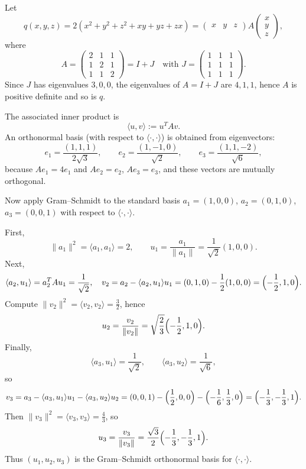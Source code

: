 \begin{solution}
Let
\[
q(x,y,z)=2(x^2+y^2+z^2+xy+yz+zx)=\begin{pmatrix}x&y&z\end{pmatrix}A\begin{pmatrix}x\\y\\z\end{pmatrix},
\]
where
\[
A=\begin{pmatrix}2&1&1\\1&2&1\\1&1&2\end{pmatrix}=I+J
\quad\text{with }J=\begin{pmatrix}1&1&1\\1&1&1\\1&1&1\end{pmatrix}.
\]
Since $J$ has eigenvalues $3,0,0$, the eigenvalues of $A=I+J$ are $4,1,1$, hence $A$ is positive definite and so is $q$.

The associated inner product is
\[
\langle u,v\rangle := u^TAv.
\]
An orthonormal basis (with respect to $\langle\cdot,\cdot\rangle$) is obtained from eigenvectors:
\[
e_1=\frac{(1,1,1)}{2\sqrt3},\qquad
e_2=\frac{(1,-1,0)}{\sqrt2},\qquad
e_3=\frac{(1,1,-2)}{\sqrt6},
\]
because $Ae_1=4e_1$ and $Ae_2=e_2$, $Ae_3=e_3$, and these vectors are mutually orthogonal.

Now apply Gram--Schmidt to the standard basis $a_1=(1,0,0)$, $a_2=(0,1,0)$, $a_3=(0,0,1)$ with respect to $\langle\cdot,\cdot\rangle$.

First,
\[
\|a_1\|^2=\langle a_1,a_1\rangle=2,\qquad
u_1=\frac{a_1}{\|a_1\|}=\frac1{\sqrt2}(1,0,0).
\]
Next,
\[
\langle a_2,u_1\rangle = a_2^TAu_1=\frac1{\sqrt2},
\quad
v_2=a_2-\langle a_2,u_1\rangle u_1=(0,1,0)-\frac12(1,0,0)=\Bigl(-\frac12,1,0\Bigr).
\]
Compute $\|v_2\|^2=\langle v_2,v_2\rangle=\frac32$, hence
\[
u_2=\frac{v_2}{\|v_2\|}=\sqrt{\frac23}\Bigl(-\frac12,1,0\Bigr).
\]
Finally,
\[
\langle a_3,u_1\rangle=\frac1{\sqrt2},\qquad
\langle a_3,u_2\rangle=\frac1{\sqrt6},
\]
so
\[
v_3=a_3-\langle a_3,u_1\rangle u_1-\langle a_3,u_2\rangle u_2
=(0,0,1)-\Bigl(\frac12,0,0\Bigr)-\Bigl(-\frac16,\frac13,0\Bigr)=\Bigl(-\frac13,-\frac13,1\Bigr).
\]
Then $\|v_3\|^2=\langle v_3,v_3\rangle=\frac43$, so
\[
u_3=\frac{v_3}{\|v_3\|}=\frac{\sqrt3}{2}\Bigl(-\frac13,-\frac13,1\Bigr).
\]
Thus $(u_1,u_2,u_3)$ is the Gram--Schmidt orthonormal basis for $\langle\cdot,\cdot\rangle$.
\end{solution}

